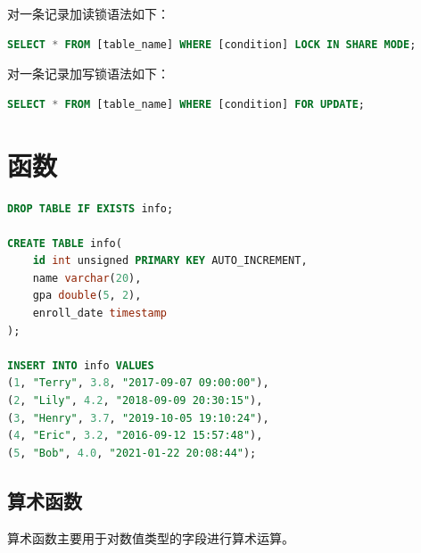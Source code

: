 \documentclass[12pt, openany, oneside]{book}
\begin{document}
对一条记录加读锁语法如下：

\vspace{-0.5cm}

\begin{lstlisting}[language=SQL]
SELECT * FROM [table_name] WHERE [condition] LOCK IN SHARE MODE;
\end{lstlisting}

对一条记录加写锁语法如下：

\vspace{-0.5cm}

\begin{lstlisting}[language=SQL]
SELECT * FROM [table_name] WHERE [condition] FOR UPDATE;
\end{lstlisting}

\newpage

\chapter{函数}

\vspace{0.5cm}


\begin{lstlisting}[language=SQL]
DROP TABLE IF EXISTS info;

CREATE TABLE info(
    id int unsigned PRIMARY KEY AUTO_INCREMENT,
    name varchar(20),
    gpa double(5, 2),
    enroll_date timestamp
);

INSERT INTO info VALUES
(1, "Terry", 3.8, "2017-09-07 09:00:00"),
(2, "Lily", 4.2, "2018-09-09 20:30:15"),
(3, "Henry", 3.7, "2019-10-05 19:10:24"),
(4, "Eric", 3.2, "2016-09-12 15:57:48"),
(5, "Bob", 4.0, "2021-01-22 20:08:44");
\end{lstlisting}

\vspace{0.5cm}

\section{算术函数}

算术函数主要用于对数值类型的字段进行算术运算。

\begin{table}[H]
	\centering
	\caption{算术函数}
\end{table}
\end{document}
